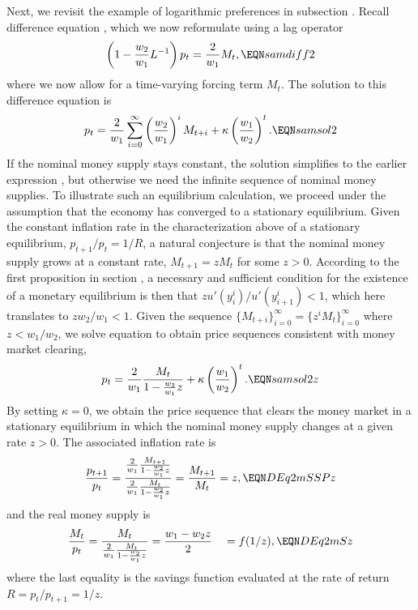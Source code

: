 Next, we revisit the example of logarithmic preferences in
subsection . Recall difference equation 
, which we now reformulate using a lag operator
$$\left( 1 - {w_2 \over w_1} L^{-1} \right) p_t = {2 \over w_1} M_t,
                                                       \EQN samdiff2
$$
where we now allow for a time-varying forcing term
$M_t$. The solution to this difference equation is
$$ p_t = {2 \over w_1} \sum_{i=0}^\infty \left({w_2 \over w_1}\right)^i M_{t+i}
      + \kappa \left({w_1\over w_2}\right)^t. \EQN samsol2 $$
If the nominal money supply stays constant, the solution simplifies
to the earlier expression , but otherwise we need the infinite sequence
of nominal money supplies. To illustrate such an equilibrium
calculation, we proceed under the assumption that the economy has converged 
to a stationary equilibrium. Given the constant inflation rate in the
characterization above of a stationary equilibrium, $p_{t+1}/p_t=1/R$,
a natural conjecture is that the nominal money supply grows at a
constant rate, $M_{t+1} = zM_t$ for some $z>0$. According to
the first proposition in section , a necessary 
and sufficient condition for the existence of a monetary equilibrium
is then that $z u'(y^i_i)/u'(y^i_{i+1})<1$, which here translates
to  $z w_2/w_1<1$.
Given the sequence $\{M_{t+i}\}_{i=0}^\infty=\{z^i M_t\}_{i=0}^\infty$
where $z<w_1/w_2$,  we solve equation  to obtain  
price sequences consistent with money market clearing,
$$ p_t = {2 \over w_1} { M_t \over 1 - {w_2 \over w_1} z }
      + \kappa \left({w_1\over w_2}\right)^t. \EQN samsol2z 
$$
By setting $\kappa=0$, we obtain the price sequence that clears
the money market in a stationary equilibrium in which the 
nominal money supply changes at a given rate $z>0$. The
associated inflation rate is
$$
{p_{t+1} \over p_t} = { {2 \over w_1} { M_{t+1} \over 1 - {w_2 \over w_1} z }
           \over {2 \over w_1} { M_t \over 1 - {w_2 \over w_1} z } }
                    = {M_{t+1} \over M_t} = z,           \EQN DEq2mSSPz
$$
and the real money supply is
$$
{M_t \over p_t} = { M_t \over {2 \over w_1} { M_t \over 1 - {w_2 \over w_1} z } }
                = {w_1 -w_2 z  \over 2}   \quad = f(1/z),  \EQN DEq2mSz
$$
where the last equality is the savings function evaluated at the rate
of return $R=p_t/p_{t+1}=1/z$. 

